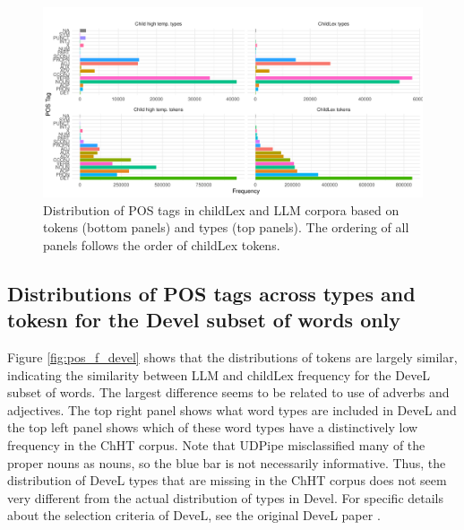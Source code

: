 \documentclass[doc, a4paper, anonymous]{apa7}
\begin{document}
\begin{figure}[!htbp]
    \includegraphics[width = 0.8\paperwidth]{figures/pos_f.pdf}
    \caption{Distribution of POS tags in childLex and LLM corpora based on tokens (bottom panels) and types (top panels). The ordering of all panels follows the order of childLex tokens. }
    \label{fig:pos_f}
\end{figure}

\clearpage


\subsection{Distributions of POS tags across types and tokesn for the Devel subset of words only}

Figure \ref{fig:pos_f_devel} shows that the distributions of tokens are largely similar, indicating the similarity between LLM and childLex frequency for the DeveL subset of words. The largest difference seems to be related to use of adverbs and adjectives. The top right panel shows what word types are included in DeveL and the top left panel shows which of these word types have a distinctively low frequency in the ChHT corpus. Note that UDPipe misclassified many of the proper nouns as nouns, so the blue bar is not necessarily informative. Thus, the distribution of DeveL types that are missing in the ChHT corpus does not seem very different from the actual distribution of types in Devel.
For specific details about the selection criteria of DeveL, see the original DeveL paper \citep{schroter_developmental_2017}.
\end{document}
